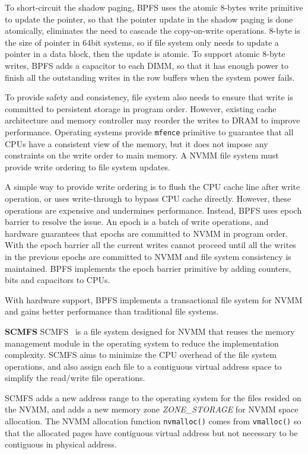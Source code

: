 To short-circuit the shadow paging, BPFS uses the atomic 8-bytes write primitive
to update the pointer, so that the pointer update in the shadow paging is done
atomically, eliminates the need to cascade the copy-on-write operations.
8-byte is the size of pointer in 64bit systems, so if file system only needs to
update a pointer in a data block, then the update is atomic. To support
atomic 8-byte writes, BPFS adds a capacitor to each DIMM, so that it has enough
power to finish all the outstanding writes in the row buffers when the system
power fails.

To provide safety and consistency, file system also needs to ensure that write
is committed to persistent storage in program order. However, existing cache
architecture and memory controller may reorder the writes to DRAM to improve
performance. Operating systems provide \texttt{mfence} primitive to guarantee
that all CPUs have a consistent view of the memory, but it does not impose
any constraints on the write order to main memory. A NVMM file system must
provide write ordering to file system updates.

A simple way to provide write ordering is to flush the CPU cache line after
write operation, or uses write-through to bypass CPU cache directly. However,
these operations are expensive and undermines performance. Instead, BPFS uses
epoch barrier to resolve the issue. An epoch is a batch of write operations,
and hardware guarantees that epochs are committed to NVMM in program order.
With the epoch barrier all the current writes cannot proceed until all the
writes in the previous epochs are committed to NVMM and file system consistency
is maintained. BPFS implements the epoch barrier primitive by adding counters,
bits and capacitors to CPUs.

With hardware support, BPFS implements a transactional file system for NVMM
and gains better performance than traditional file systems.

\textbf{SCMFS} SCMFS~\cite{scmfs} is a file system designed for NVMM that
reuses the memory
management module in the operating system to reduce the implementation
complexity. SCMFS aims to minimize the CPU overhead of the file system
operations, and also assign each file to a contiguous virtual address space
to simplify the read/write file operations.

SCMFS adds a new address range to the operating system for the files resided
on the NVMM, and 
adds a new memory zone \emph{ZONE\_STORAGE} for NVMM space allocation. The
NVMM allocation function \texttt{nvmalloc()} comes from \texttt{vmalloc()}
so that the allocated pages have contiguous virtual address but not necessary
to be contiguous in physical address.

